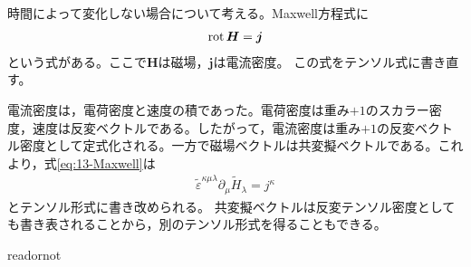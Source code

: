 \documentclass[uplatex]{jsarticle}
\begin{document}
\sukima{}\par
時間によって変化しない場合について考える。Maxwell方程式に
\begin{align}
  \label{eq:13-Maxwell}
  \operatorname{rot} \bm{H} = \bm{j}
\end{align}
という式がある。ここで$\bm{H}$は磁場，$\bm{j}$は電流密度。
この式をテンソル式に書き直す。

電流密度は，電荷密度と速度の積であった。電荷密度は重み$+1$のスカラー密度，速度は反変ベクトルである。したがって，電流密度は重み$+1$の反変ベクトル密度として定式化される。一方で磁場ベクトルは共変擬ベクトルである。これより，式\eqref{eq:13-Maxwell}は
\begin{align*}
  \tilde{\varepsilon}^{\kappa\mu\lambda} \partial_{\mu} \tilde{H}_{\lambda} = j^{\kappa}
\end{align*}
とテンソル形式に書き改められる。
共変擬ベクトルは反変テンソル密度としても書き表されることから，別のテンソル形式を得ることもできる。

\expandafter\ifx\csname readornot\endcsname\relax
  
\end{document}
